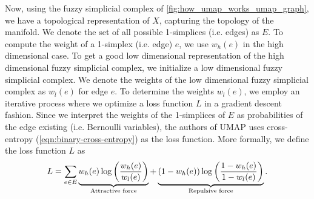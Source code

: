 Now, using the fuzzy simplicial complex of \cref{fig:how_umap_works_umap_graph}, we have a topological representation of $X$, capturing the topology of the manifold. We denote the set of all possible 1-simplices (i.e. edges) as $E$. To compute the weight of a 1-simplex (i.e. edge) $e$, we use $w_h(e)$ in the high dimensional case. To get a good low dimensional representation of the high dimensional fuzzy simplicial complex, we initialize a low dimensional fuzzy simplicial complex. We denote the weights of the low dimensional fuzzy simplicial complex as $w_l(e)$ for edge $e$. To determine the weights $w_l(e)$, we employ an iterative process where we optimize a loss function $L$ in a gradient descent fashion. Since we interpret the weights of the 1-simplices of $E$ as probabilities of the edge existing (i.e. Bernoulli variables), the authors of UMAP uses cross-entropy (\cref{eqn:binary-cross-entropy}) as the loss function. More formally, we define the loss function $L$ as
\begin{align}
    L = \sumlim{e \in E}{} \undertext{w_h(e) \log \enclp{\frac{w_h(e)}{w_l(e)}}}{Attractive force} + \undertext{(1 - w_h(e)) \log \enclp{\frac{1 - w_h(e)}{1 - w_l(e)}}}{Repulsive force}.
    \label{eqn:umap-loss-function}
\end{align}


